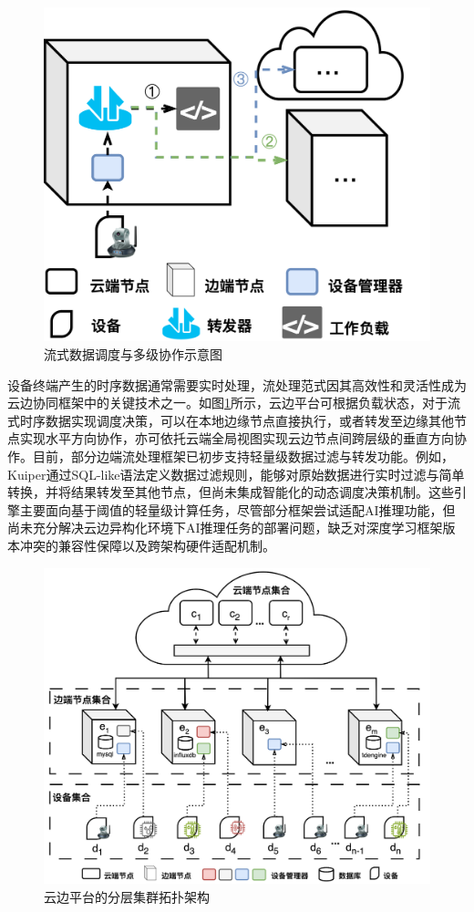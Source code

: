 \begin{figure}[h]
  \centering
  \includegraphics[width=0.5\linewidth]{pics/3-1流处理.png}
  \caption{流式数据调度与多级协作示意图}
  \label{fig:3-1flow}
\end{figure}

设备终端产生的时序数据通常需要实时处理，流处理范式因其高效性和灵活性成为云边协同框架中的关键技术之一\cite{de2018distributed,wang2020edge}。如图\ref{fig:3-1flow}所示，云边平台可根据负载状态，对于流式时序数据实现调度决策，可以在本地边缘节点直接执行，或者转发至边缘其他节点实现水平方向协作，亦可依托云端全局视图实现云边节点间跨层级的垂直方向协作。目前，部分边端流处理框架已初步支持轻量级数据过滤与转发功能。例如，Kuiper\cite{ekuiper}通过SQL-like语法定义数据过滤规则，能够对原始数据进行实时过滤与简单转换，并将结果转发至其他节点，但尚未集成智能化的动态调度决策机制。这些引擎主要面向基于阈值的轻量级计算任务，尽管部分框架尝试适配AI推理功能，但尚未充分解决云边异构化环境下AI推理任务的部署问题，缺乏对深度学习框架版本冲突的兼容性保障以及跨架构硬件适配机制。

\begin{figure}[h]
  \centering
  \includegraphics[width=0.8\linewidth]{pics/3-2模型架构.png}
  \caption{云边平台的分层集群拓扑架构}
  \label{fig:3-2model}
\end{figure}

